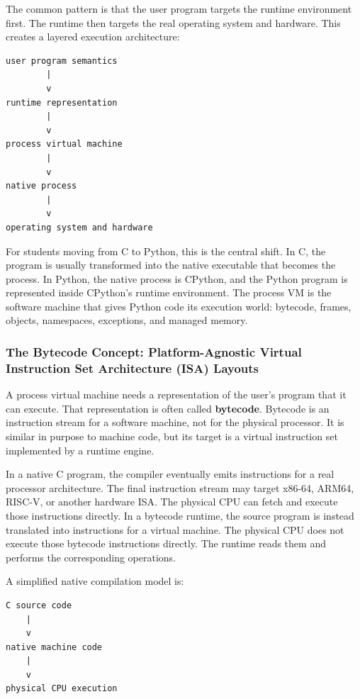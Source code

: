 \documentclass[a4paper,twoside]{report}
\begin{document}
The common pattern is that the user program targets the runtime environment first. The runtime then targets the real operating system and hardware. This creates a layered execution architecture:

\begin{verbatim}
user program semantics
        |
        v
runtime representation
        |
        v
process virtual machine
        |
        v
native process
        |
        v
operating system and hardware
\end{verbatim}

For students moving from C to Python, this is the central shift. In C, the program is usually transformed into the native executable that becomes the process. In Python, the native process is CPython, and the Python program is represented inside CPython's runtime environment. The process VM is the software machine that gives Python code its execution world: bytecode, frames, objects, namespaces, exceptions, and managed memory.



\subsubsection{The Bytecode Concept: Platform-Agnostic Virtual Instruction Set Architecture (ISA) Layouts}

A process virtual machine needs a representation of the user's program that it can execute. That representation is often called \textbf{bytecode}. Bytecode is an instruction stream for a software machine, not for the physical processor. It is similar in purpose to machine code, but its target is a virtual instruction set implemented by a runtime engine.

In a native C program, the compiler eventually emits instructions for a real processor architecture. The final instruction stream may target x86-64, ARM64, RISC-V, or another hardware ISA. The physical CPU can fetch and execute those instructions directly. In a bytecode runtime, the source program is instead translated into instructions for a virtual machine. The physical CPU does not execute those bytecode instructions directly. The runtime reads them and performs the corresponding operations.

A simplified native compilation model is:

\begin{verbatim}
C source code
    |
    v
native machine code
    |
    v
physical CPU execution
\end{verbatim}
\end{document}
